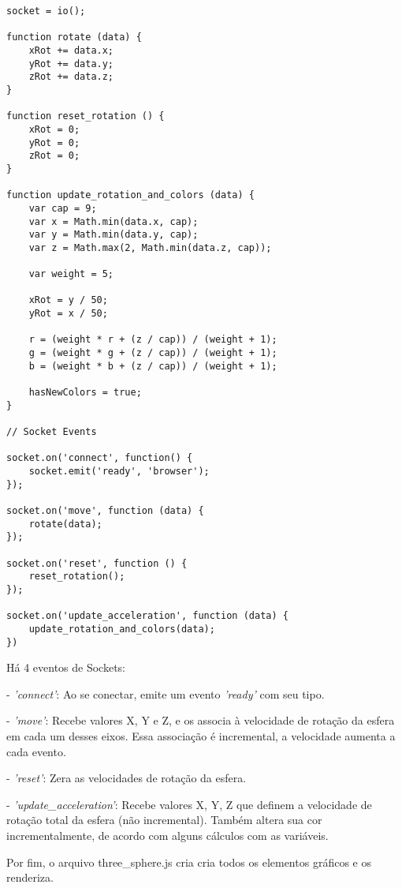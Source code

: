 \documentclass[a4paper,12pt]{article}
\begin{document}
\begin{small}
\begin{Verbatim}[frame=single]
socket = io();

function rotate (data) {
    xRot += data.x;
    yRot += data.y;
    zRot += data.z;
}

function reset_rotation () {
    xRot = 0;
    yRot = 0;
    zRot = 0;
}

function update_rotation_and_colors (data) {
    var cap = 9;
    var x = Math.min(data.x, cap);
    var y = Math.min(data.y, cap);
    var z = Math.max(2, Math.min(data.z, cap));

    var weight = 5;

    xRot = y / 50;
    yRot = x / 50;

    r = (weight * r + (z / cap)) / (weight + 1);
    g = (weight * g + (z / cap)) / (weight + 1);
    b = (weight * b + (z / cap)) / (weight + 1);

    hasNewColors = true;
}

// Socket Events

socket.on('connect', function() {
    socket.emit('ready', 'browser');
});

socket.on('move', function (data) {
    rotate(data);
});

socket.on('reset', function () {
    reset_rotation();
});

socket.on('update_acceleration', function (data) {
    update_rotation_and_colors(data);
})
\end{Verbatim}
\end{small}

Há 4 eventos de Sockets:

- \emph{'connect'}: Ao se conectar, emite um evento \emph{'ready'} com seu tipo.

- \emph{'move'}: Recebe valores X, Y e Z, e os associa à velocidade de rotação da esfera em cada um desses eixos. Essa associação é incremental, a velocidade aumenta a cada evento.

- \emph{'reset'}: Zera as velocidades de rotação da esfera.

- \emph{'update\_acceleration'}: Recebe valores X, Y, Z que definem a velocidade de rotação total da esfera (não incremental). Também altera sua cor incrementalmente, de acordo com alguns cálculos com as variáveis.


Por fim, o arquivo three\_sphere.js cria cria todos os elementos gráficos e os renderiza.
\end{document}
